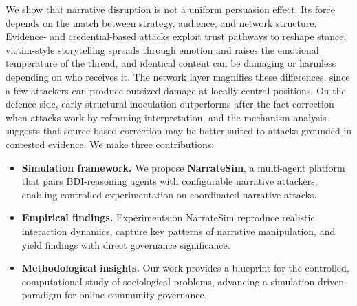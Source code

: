We show that narrative disruption is not a uniform persuasion effect. Its force depends on the match between strategy, audience, and network structure. Evidence- and credential-based attacks exploit trust pathways to reshape stance, victim-style storytelling spreads through emotion and raises the emotional temperature of the thread, and identical content can be damaging or harmless depending on who receives it. The network layer magnifies these differences, since a few attackers can produce outsized damage at locally central positions. On the defence side, early structural inoculation outperforms after-the-fact correction when attacks work by reframing interpretation, and the mechanism analysis suggests that source-based correction may be better suited to attacks grounded in contested evidence. We make three contributions:
\vspace{-4pt}
\begin{itemize}
\setlength{\topsep}{0pt}
\setlength{\itemsep}{1pt}
\item \textbf{Simulation framework.} We propose \textbf{NarrateSim}, a multi-agent platform that pairs BDI-reasoning agents with configurable narrative attackers, enabling controlled experimentation on coordinated narrative attacks.
\item \textbf{Empirical findings.} Experiments on NarrateSim reproduce realistic interaction dynamics, capture key patterns of narrative manipulation, and yield findings with direct governance significance.
\item \textbf{Methodological insights.} Our work provides a blueprint for the controlled, computational study of sociological problems, advancing a simulation-driven paradigm for online community governance.
\end{itemize}
